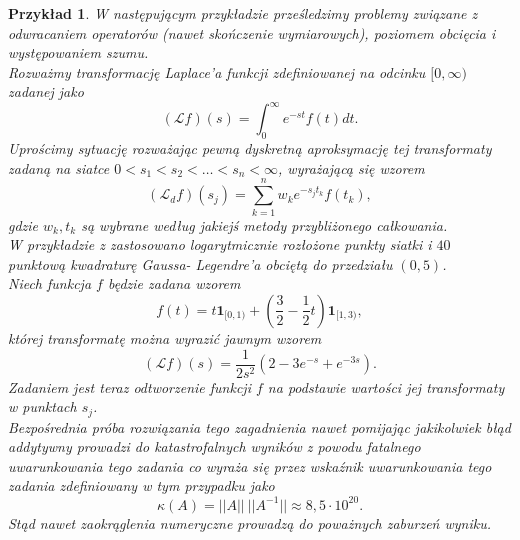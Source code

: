 \documentclass[12pt]{article}
\newtheorem{prz}{Przykład}
\begin{document}
\begin{prz}
W następującym przykładzie prześledzimy problemy związane z odwracaniem operatorów (nawet skończenie wymiarowych), poziomem obcięcia i występowaniem szumu.\\
Rozważmy transformację Laplace'a funkcji zdefiniowanej na odcinku $[0,\infty)$ zadanej jako
\begin{displaymath}
(\mathcal{L}f)(s)=\int_0^{\infty}e^{-st}f(t)dt.
\end{displaymath}
Uprościmy sytuację rozważając pewną dyskretną aproksymację tej transformaty zadaną na siatce $0<s_1<s_2< \dots <s_n<\infty$, wyrażającą się wzorem
\begin{displaymath}
(\mathcal{L}_df)(s_j)=\sum_{k=1}^n w_ke^{-s_jt_k}f(t_k),
\end{displaymath}
gdzie $w_k,t_k$ są wybrane według jakiejś metody przybliżonego całkowania.\\
W przykładzie z \cite{kaipo} zastosowano logarytmicznie rozłożone punkty siatki i $40$ punktową kwadraturę Gaussa- Legendre'a obciętą do przedziału $(0,5)$.\\
Niech funkcja $f$ będzie zadana wzorem
\begin{displaymath}
f(t)=t\pmb{1}_{[0,1)}+\left(\frac{3}{2}-\frac{1}{2}t\right)\pmb{1}_{[1,3)},
\end{displaymath}
której transformatę można wyrazić jawnym wzorem 
\begin{displaymath}
(\mathcal{L}f)(s)=\frac{1}{2s^2}\left(2-3e^{-s}+e^{-3s}\right).
\end{displaymath}
Zadaniem jest teraz odtworzenie funkcji $f$ na podstawie wartości jej transformaty w punktach $s_j$.\\
Bezpośrednia próba rozwiązania tego zagadnienia nawet pomijając jakikolwiek błąd addytywny prowadzi do katastrofalnych wyników z powodu fatalnego uwarunkowania tego zadania co wyraża się przez wskaźnik uwarunkowania tego zadania zdefiniowany w tym przypadku jako 
\begin{displaymath}
\kappa (A)=||A||\ ||A^{-1}||\approx 8,5\cdot 10^{20}.
\end{displaymath}
Stąd nawet zaokrąglenia numeryczne prowadzą do poważnych zaburzeń wyniku.


\end{prz}
\end{document}
